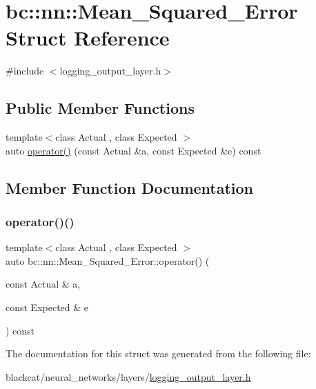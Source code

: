 \hypertarget{structbc_1_1nn_1_1Mean__Squared__Error}{}\section{bc\+:\+:nn\+:\+:Mean\+\_\+\+Squared\+\_\+\+Error Struct Reference}
\label{structbc_1_1nn_1_1Mean__Squared__Error}


{\ttfamily \#include $<$logging\+\_\+output\+\_\+layer.\+h$>$}

\subsection*{Public Member Functions}
\begin{DoxyCompactItemize}
\item 
{\footnotesize template$<$class Actual , class Expected $>$ }\\auto \hyperlink{structbc_1_1nn_1_1Mean__Squared__Error_ab1ea1f8c9ecf1eb59cf1119c5cebf43e}{operator()} (const Actual \&a, const Expected \&e) const
\end{DoxyCompactItemize}


\subsection{Member Function Documentation}
\mbox{\label{structbc_1_1nn_1_1Mean__Squared__Error_ab1ea1f8c9ecf1eb59cf1119c5cebf43e}} 
\subsubsection{\texorpdfstring{operator()()}{operator()()}}
{\footnotesize\ttfamily template$<$class Actual , class Expected $>$ \\
auto bc\+::nn\+::\+Mean\+\_\+\+Squared\+\_\+\+Error\+::operator() (\begin{DoxyParamCaption}\item[{const Actual \&}]{a,  }\item[{const Expected \&}]{e }\end{DoxyParamCaption}) const\hspace{0.3cm}{\ttfamily [inline]}}



The documentation for this struct was generated from the following file\+:\begin{DoxyCompactItemize}
\item 
blackcat/neural\+\_\+networks/layers/\hyperlink{logging__output__layer_8h}{logging\+\_\+output\+\_\+layer.\+h}\end{DoxyCompactItemize}
